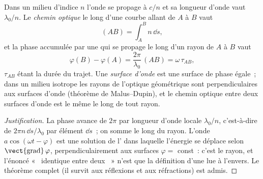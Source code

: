 \begin{definition}\label{def:b2:scalar-light-model:path}
Dans un milieu d'indice $n$ l'onde se propage à $c/n$ et sa longueur d'onde
vaut $\lambda_0/n$. Le \emph{chemin optique} le long d'une courbe allant de $A$ à $B$ vaut
\[
(AB) = \int_A^Bn\,\dd s ,
\]
et la phase accumulée par une  qui se propage le long d'un
rayon de $A$ à $B$ vaut
\[
\varphi(B) - \varphi(A) = \frac{2\pi}{\lambda_0}\,(AB) = \omega\,\tau_{AB} ,
\]
$\tau_{AB}$ étant la durée du trajet. Une \emph{surface d'onde} est une surface
de phase égale~; dans un milieu isotrope les rayons de l'optique géométrique sont
perpendiculaires aux surfaces d'onde (théorème de Malus--Dupin), et le chemin
optique entre deux surfaces d'onde est le même le long de tout rayon.
\end{definition}

\begin{proof}[Justification]
La phase avance de $2\pi$ par longueur d'onde locale $\lambda_0/n$, c'est-à-dire de
$2\pi n\,\dd s/\lambda_0$ par élément $\dd s$~; on somme le long du rayon. L'onde
$a\cos(\omega t - \varphi)$ est une solution de l' dans laquelle
l'énergie se déplace selon $\operatorname{\vect{grad}}\varphi$, perpendiculairement aux
surfaces $\varphi = $ const~: c'est le rayon, et l'énoncé «~ identique
entre deux ~» n'est que la définition d'une 
lue à l'envers. Le théorème complet (il survit aux réflexions et aux
réfractions) est admis.
\end{proof}

